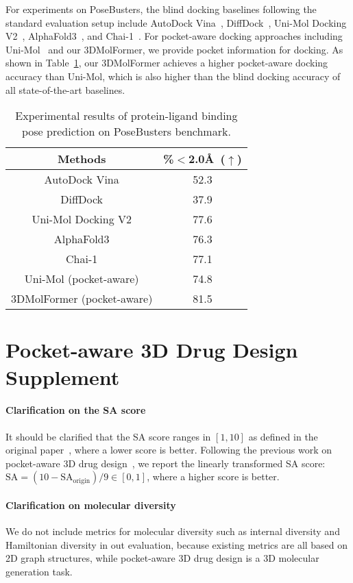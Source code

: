 For experiments on PoseBusters, the blind docking baselines following the standard evaluation setup include AutoDock Vina~\citep{AutoDockVina}, DiffDock~\citep{DiffDock}, Uni-Mol Docking V2~\citep{Uni-Mol-Docking-V2}, AlphaFold3~\citep{AlphaFold3}, and Chai-1~\citep{Chai-1}. For pocket-aware docking approaches including Uni-Mol~\citep{Uni-Mol} and our 3DMolFormer, we provide pocket information for docking. As shown in Table~\ref{PoseBusters-results}, our 3DMolFormer achieves a higher pocket-aware docking accuracy than Uni-Mol, which is also higher than the blind docking accuracy of all state-of-the-art baselines.

\begin{table}[ht]
\caption{Experimental results of protein-ligand binding pose prediction on PoseBusters benchmark.}
\label{PoseBusters-results}
\begin{center}
\begin{tabular}{cc}
\hline
Methods & \%$<$2.0\AA~($\uparrow$) \\ \hline
AutoDock Vina & 52.3\\
DiffDock & 37.9\\
Uni-Mol Docking V2 & 77.6\\
AlphaFold3 & 76.3 \\
Chai-1 & 77.1 \\ \hline
Uni-Mol (pocket-aware) & 74.8 \\
3DMolFormer (pocket-aware) & 81.5\\ \hline
\end{tabular}
\end{center}
\end{table}



\section{Pocket-aware 3D Drug Design Supplement}
\label{app4}
\paragraph{Clarification on the SA score}
It should be clarified that the SA score ranges in $[1,10]$ as defined in the original paper~\citep{SA}, where a lower score is better. Following the previous work on pocket-aware 3D drug design~\citep{DecompDiff}, we report the linearly transformed SA score: $\text{SA}=(10-\text{SA}_\text{origin})/9\in[0,1]$, where a higher score is better.

\paragraph{Clarification on molecular diversity}
We do not include metrics for molecular diversity such as internal diversity \cite{IntDiv} and Hamiltonian diversity \cite{HamDiv} in out evaluation, because existing metrics are all based on 2D graph structures, while pocket-aware 3D drug design is a 3D molecular generation task.

